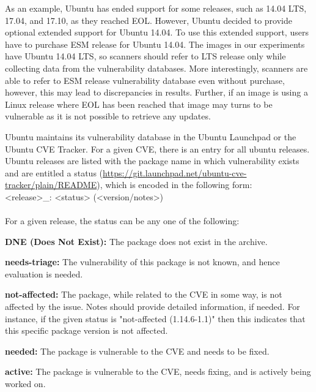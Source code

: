 \documentclass[a4paper,num-refs]{oup-contemporary}
\begin{document}
As an example, Ubuntu has ended support for some releases, such as 14.04 LTS,
17.04, and 17.10, as they reached EOL. However, Ubuntu decided to provide optional extended support for Ubuntu 14.04.
To use this extended support, users have to purchase ESM release for Ubuntu 14.04.
The images in our experiments have Ubuntu 14.04 LTS, so scanners should refer
to LTS release only while collecting data from the vulnerability databases.
More interestingly, scanners are able to refer to ESM release vulnerability database
even without purchase, however, this may lead to discrepancies in results.
Further, if an image is using a Linux release where EOL has been reached that image may
turns to be vulnerable as it is not possible to retrieve any updates.

Ubuntu maintains its vulnerability database in the Ubuntu Launchpad or the Ubuntu CVE Tracker. For a given CVE, there is an entry for all ubuntu releases.
Ubuntu releases are listed with the package name
in which vulnerability exists and are entitled a status
(\url{https://git.launchpad.net/ubuntu-cve-tracker/plain/README}), which is
encoded in the following form:
\newline \\
\noindent <release>\_<source-package>: <status> (<version/notes>) \\
\newline\\
For a given release, the status can be any one of the following:

\textbf{DNE (Does Not Exist):} The package does not exist in the
		archive.

\textbf{needs-triage:} The vulnerability of this package
		is not known, and hence evaluation is needed.

\textbf{not-affected:} The package, while related to the
		CVE in some way, is not affected by the issue. Notes should
		provide detailed information, if needed. For instance, if the given
		status is "not-affected (1.14.6-1.1)" then this indicates that this specific
		package version is not affected.

\textbf{needed:} The package is vulnerable to the
		CVE and needs to be fixed.

\textbf{active:} The package is vulnerable to the
		CVE, needs fixing, and is actively being worked on.
\end{document}
